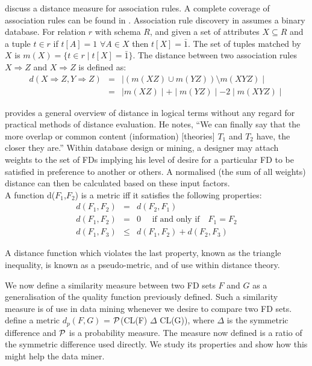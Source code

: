 \cite{tkr95} discuss a distance measure for association rules. A
complete coverage of association rules can be found in \cite{ais93}.
Association rule discovery in \cite{ais93} assumes a binary database.
For relation $r$ with schema $R$, and given a set of attributes
 $X \subseteq R$ and a tuple $t \in r$ if $t[A] = 1$  $\forall A \in X$
then $t[X] = \bar{1}$.  The set of tuples matched by $X$ is
$m(X) = \{ t \in r \mid t[X] = \bar{1} \}$.  The distance between
two association rules $X \Rightarrow Z$ and $X \Rightarrow Z$ is
defined as:
\begin{eqnarray*}
d(X \Rightarrow Z, Y \Rightarrow Z) & = & \mid (m(XZ) \cup m(YZ)) \setminus m(XYZ) \mid \\
 				    & = & \mid m(XZ) \mid + \mid m(YZ) \mid - 2 \mid m(XYZ) \mid
\end{eqnarray*}

\cite{tuo78} provides a general overview of distance in logical
terms without any regard for practical methods of distance 
evaluation. He notes, ``We can finally say that the more
overlap or common content  (information) [theories] $T_1$ and $T_2$
have, the closer they are.'' Within database design or mining, a
designer may attach weights to the set of FDs implying his
level of desire for a particular FD to be satisfied in
preference to another or others. A normalised (the sum of
all weights) distance can then be calculated based on these
input factors. \\

A function d($F_1$,$F_2$) is a metric iff it satisfies the
following properties:
\begin{eqnarray}
d(F_1,F_2) & = & d(F_2, F_1)  \\
d(F_1,F_2)   & = & 0 \quad\mbox{ if and only if}\quad F_1 = F_2  \\
d(F_1,F_3)   & \le & d(F_1,F_2) + d(F_2,F_3) 
\end{eqnarray}

A distance function which violates the last property, known as the
triangle inequality, is known as a pseudo-metric, and of use within
distance theory. 

We now define a similarity measure between two FD sets $F$ and $G$ as
a generalisation of the quality function previously defined. Such a
similarity measure is of use in data mining whenever we desire to
compare two FD sets. \cite{km95} define a metric $d_p(F,G)$ = ${\cal
P}$(CL(F) $\Delta$ CL(G)), where $\Delta$ is the symmetric difference and
${\cal P}$ is a probability measure. The measure now defined is a
ratio of the symmetric difference used directly. We study its
properties and show how this might help the data miner.

